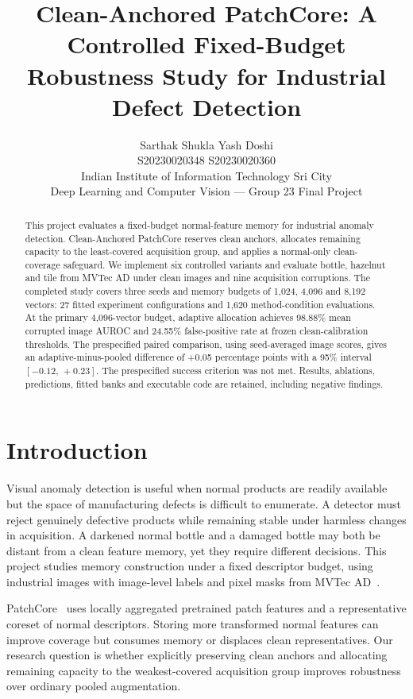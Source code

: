 \documentclass[10pt,twocolumn,letterpaper]{article}
\title{Clean-Anchored PatchCore: A Controlled Fixed-Budget\\Robustness Study for Industrial Defect Detection}
\author{Sarthak Shukla \qquad Yash Doshi\\
{\small S20230020348 \qquad S20230020360}\\
Indian Institute of Information Technology Sri City\\
{\small Deep Learning and Computer Vision --- Group 23 Final Project}}
\begin{document}
\maketitle
\begin{abstract}
This project evaluates a fixed-budget normal-feature memory for industrial anomaly detection. Clean-Anchored PatchCore reserves clean anchors, allocates remaining capacity to the least-covered acquisition group, and applies a normal-only clean-coverage safeguard. We implement six controlled variants and evaluate bottle, hazelnut and tile from MVTec AD under clean images and nine acquisition corruptions. The completed study covers three seeds and memory budgets of 1,024, 4,096 and 8,192 vectors: 27 fitted experiment configurations and 1,620 method-condition evaluations. At the primary 4,096-vector budget, adaptive allocation achieves 98.88\% mean corrupted image AUROC and 24.55\% false-positive rate at frozen clean-calibration thresholds. The prespecified paired comparison, using seed-averaged image scores, gives an adaptive-minus-pooled difference of +0.05 percentage points with a 95\% interval $[-0.12,\,+0.23]$. The prespecified success criterion was not met. Results, ablations, predictions, fitted banks and executable code are retained, including negative findings.
\end{abstract}

\section{Introduction}
Visual anomaly detection is useful when normal products are readily available but the space of manufacturing defects is difficult to enumerate. A detector must reject genuinely defective products while remaining stable under harmless changes in acquisition. A darkened normal bottle and a damaged bottle may both be distant from a clean feature memory, yet they require different decisions. This project studies memory construction under a fixed descriptor budget, using industrial images with image-level labels and pixel masks from MVTec AD~\cite{bergmann2019}.

PatchCore~\cite{roth2022} uses locally aggregated pretrained patch features and a representative coreset of normal descriptors. Storing more transformed normal features can improve coverage but consumes memory or displaces clean representatives. Our research question is whether explicitly preserving clean anchors and allocating remaining capacity to the weakest-covered acquisition group improves robustness over ordinary pooled augmentation.
\end{document}
